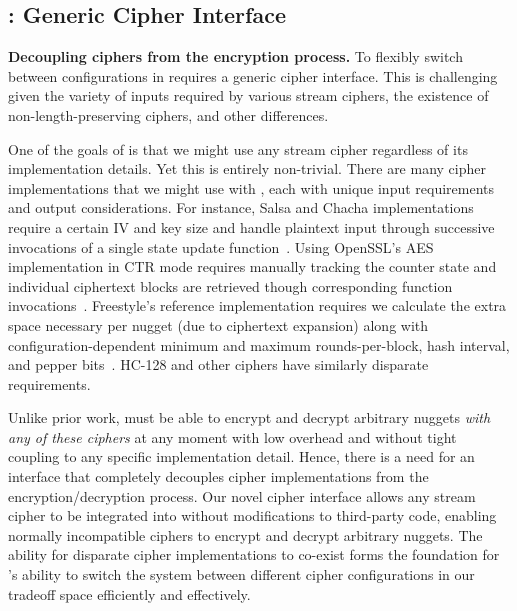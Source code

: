 \subsection{\sysB: Generic Cipher Interface}\label{subsec:des-crypts}

\textbf{Decoupling ciphers from the encryption process.} To flexibly switch
between configurations in \sys requires a generic cipher interface. This is
challenging given the variety of inputs required by various stream ciphers, the
existence of non-length-preserving ciphers, and other differences.

One of the goals of \sys is that we might use any stream cipher regardless of
its implementation details. Yet this is entirely non-trivial. There are many
cipher implementations that we might use with \sys, each with unique input
requirements and output considerations. For instance, Salsa and Chacha
implementations require a certain IV and key size and handle plaintext input
through successive invocations of a single state update
function~\cite{Floodyberry}. Using OpenSSL's AES implementation in CTR mode
requires manually tracking the counter state and individual ciphertext blocks
are retrieved though corresponding function invocations~\cite{OpenSSL}.
Freestyle's reference implementation requires we calculate the extra space
necessary per nugget (due to ciphertext expansion) along with
configuration-dependent minimum and maximum rounds-per-block, hash interval, and
pepper bits~\cite{Freestyle}. HC-128 and other ciphers have similarly disparate
requirements.


Unlike prior work, \sys must be able to encrypt and decrypt arbitrary nuggets
\emph{with any of these ciphers} at any moment with low overhead and without
tight coupling to any specific implementation detail. Hence, there is a need for
an interface that completely decouples cipher implementations from the
encryption/decryption process. Our novel cipher interface allows any stream
cipher to be integrated into \sys without modifications to third-party code,
enabling normally incompatible ciphers to encrypt and decrypt arbitrary nuggets.
The ability for disparate cipher implementations to co-exist forms the
foundation for \sys's ability to switch the system between different cipher
configurations in our tradeoff space efficiently and effectively.

